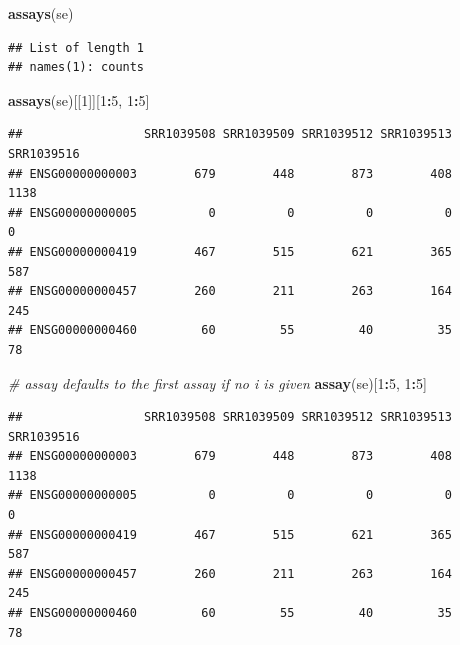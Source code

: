 \documentclass[]{article}
\newenvironment{Shaded}{\begin{snugshade}}{\end{snugshade}}
\newcommand{\CommentTok}[1]{\textcolor[rgb]{0.56,0.35,0.01}{\textit{#1}}}
\newcommand{\DecValTok}[1]{\textcolor[rgb]{0.00,0.00,0.81}{#1}}
\newcommand{\KeywordTok}[1]{\textcolor[rgb]{0.13,0.29,0.53}{\textbf{#1}}}
\newcommand{\NormalTok}[1]{#1}
\newcommand{\OperatorTok}[1]{\textcolor[rgb]{0.81,0.36,0.00}{\textbf{#1}}}
\begin{document}
\begin{Shaded}
\begin{Highlighting}[]
\KeywordTok{assays}\NormalTok{(se)}
\end{Highlighting}
\end{Shaded}

\begin{verbatim}
## List of length 1
## names(1): counts
\end{verbatim}

\begin{Shaded}
\begin{Highlighting}[]
\KeywordTok{assays}\NormalTok{(se)[[}\DecValTok{1}\NormalTok{]][}\DecValTok{1}\OperatorTok{:}\DecValTok{5}\NormalTok{, }\DecValTok{1}\OperatorTok{:}\DecValTok{5}\NormalTok{]}
\end{Highlighting}
\end{Shaded}

\begin{verbatim}
##                 SRR1039508 SRR1039509 SRR1039512 SRR1039513 SRR1039516
## ENSG00000000003        679        448        873        408       1138
## ENSG00000000005          0          0          0          0          0
## ENSG00000000419        467        515        621        365        587
## ENSG00000000457        260        211        263        164        245
## ENSG00000000460         60         55         40         35         78
\end{verbatim}

\begin{Shaded}
\begin{Highlighting}[]
\CommentTok{# assay defaults to the first assay if no i is given}
\KeywordTok{assay}\NormalTok{(se)[}\DecValTok{1}\OperatorTok{:}\DecValTok{5}\NormalTok{, }\DecValTok{1}\OperatorTok{:}\DecValTok{5}\NormalTok{]}
\end{Highlighting}
\end{Shaded}

\begin{verbatim}
##                 SRR1039508 SRR1039509 SRR1039512 SRR1039513 SRR1039516
## ENSG00000000003        679        448        873        408       1138
## ENSG00000000005          0          0          0          0          0
## ENSG00000000419        467        515        621        365        587
## ENSG00000000457        260        211        263        164        245
## ENSG00000000460         60         55         40         35         78
\end{verbatim}
\end{document}
